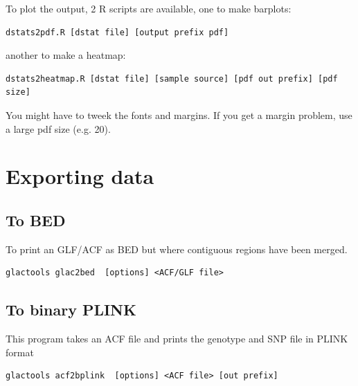 \documentclass[a4paper]{article}
\begin{document}
To plot the output, 2 R scripts are available, one to make barplots:

\begin{lstlisting}
dstats2pdf.R [dstat file] [output prefix pdf]
\end{lstlisting}

another to make a heatmap:
\begin{lstlisting}
dstats2heatmap.R [dstat file] [sample source] [pdf out prefix] [pdf size]
\end{lstlisting}

You might have to tweek the fonts and margins. If you get a margin problem, use a large pdf size (e.g. 20).












\newpage

\section{Exporting data}
\subsection{To BED}

To print an GLF/ACF as BED but where contiguous regions have been merged.
\begin{lstlisting}
glactools glac2bed  [options] <ACF/GLF file>
\end{lstlisting}


\subsection{To binary PLINK}

\noindent This program takes an ACF file and prints the genotype and SNP file in PLINK format

\tiny
\begin{lstlisting}
glactools acf2bplink  [options] <ACF file> [out prefix]
\end{lstlisting}
\normalsize
\end{document}
